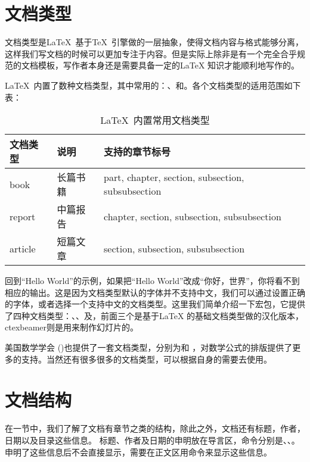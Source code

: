 \section{文档类型}\label{sec:doctype}
文档类型是\LaTeX\ 基于\TeX\
引擎做的一层抽象，使得文档内容与格式能够分离，这样我们写文档的时候可以更加专注于内容。但是实际上除非是有一个完全合乎规范的文档模板，写作者本身还是需要具备一定的\LaTeX
知识才能顺利地写作的。

\LaTeX\ 内置了数种文档类型，其中常用的：、和。各个文档类型的适用范围如下表：
\noindent
\begin{table}[ht]
	\centering
	\begin{tabular}{lll} \toprule
		文档类型 & 说明     & 支持的章节标号                                    \\ \midrule
		book     & 长篇书籍 & part, chapter, section, subsection, subsubsection \\
		report   & 中篇报告 & chapter, section, subsection, subsubsection       \\
		article  & 短篇文章 & section, subsection, subsubsection                \\
		\bottomrule
	\end{tabular}
	\caption{\LaTeX\ 内置常用文档类型}
\end{table}

回到``Hello World''的示例，如果把“Hello
World”改成“你好，世界”，你将看不到相应的输出。这是因为文档类型默认的字体并不支持中文，我们可以通过设置正确的字体，或者选择一个支持中文的文档类型。这里我们简单介绍一下宏包，它提供了四种文档类型：、、及，前面三个是基于\LaTeX
的基础文档类型做的汉化版本，ctexbeamer则是用来制作幻灯片的。

美国数学学会 (\AmS)也提供了一套文档类型，分别为和 ，对数学公式的排版提供了更多的支持。当然还有很多很多的文档类型，可以根据自身的需要去使用。

\section{文档结构}
在一节中，我们了解了文档有章节之类的结构，除此之外，文档还有标题，作者，日期以及目录这些信息。
标题、作者及日期的申明放在导言区，命令分别是\texinline{\title}、\texinline{\author}、\texinline{\date}。申明了这些信息后不会直接显示，需要在正文区用\texinline{\maketitle}命令来显示这些信息。

